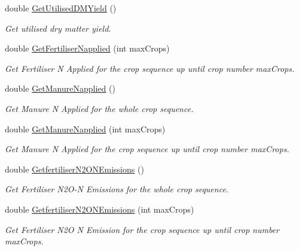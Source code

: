 \begin{DoxyCompactItemize}
double \mbox{\hyperlink{class_crop_sequence_class_a837331c0bae96fccef99bc094943c818}{Get\+Utilised\+D\+M\+Yield}} ()
\begin{DoxyCompactList}\small\item\em Get utilised dry matter yield. \end{DoxyCompactList}\item 
double \mbox{\hyperlink{class_crop_sequence_class_addf101545276712d2d93c28e298d36ae}{Get\+Fertiliser\+Napplied}} (int max\+Crops)
\begin{DoxyCompactList}\small\item\em Get Fertiliser N Applied for the crop sequence up until crop number max\+Crops. \end{DoxyCompactList}\item 
double \mbox{\hyperlink{class_crop_sequence_class_a1924ad8fa6a78b9e34d23251a32f2f62}{Get\+Manure\+Napplied}} ()
\begin{DoxyCompactList}\small\item\em Get Manure N Applied for the whole crop sequence. \end{DoxyCompactList}\item 
double \mbox{\hyperlink{class_crop_sequence_class_ab8a9ab2dcf60987421ec6d1dcc69be30}{Get\+Manure\+Napplied}} (int max\+Crops)
\begin{DoxyCompactList}\small\item\em Get Manure N Applied for the crop sequence up until crop number max\+Crops. \end{DoxyCompactList}\item 
\mbox{\label{class_crop_sequence_class_af23bd7ffab590aadee2496ef4b3ecce0}} 
double \mbox{\hyperlink{class_crop_sequence_class_af23bd7ffab590aadee2496ef4b3ecce0}{Getfertiliser\+N2\+O\+N\+Emissions}} ()
\begin{DoxyCompactList}\small\item\em Get Fertiliser N2\+O-\/N Emissions for the whole crop sequence. \end{DoxyCompactList}\item 
double \mbox{\hyperlink{class_crop_sequence_class_a25ec8b736a7caa75da1edcac08360cd7}{Getfertiliser\+N2\+O\+N\+Emissions}} (int max\+Crops)
\begin{DoxyCompactList}\small\item\em Get Fertiliser N2O N Emission for the crop sequence up until crop number max\+Crops. \end{DoxyCompactList}\item 

\end{DoxyCompactItemize}
